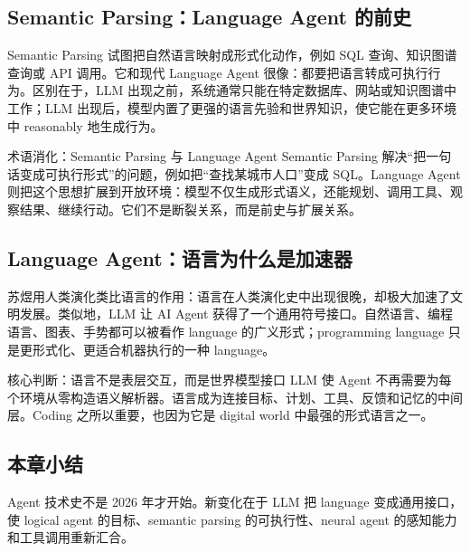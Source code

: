 \subsection{Semantic Parsing：Language Agent 的前史}

Semantic Parsing 试图把自然语言映射成形式化动作，例如 SQL 查询、知识图谱查询或 API 调用。它和现代 Language Agent 很像：都要把语言转成可执行行为。区别在于，LLM 出现之前，系统通常只能在特定数据库、网站或知识图谱中工作；LLM 出现后，模型内置了更强的语言先验和世界知识，使它能在更多环境中 reasonably 地生成行为。

\begin{knowledgebox}{术语消化：Semantic Parsing 与 Language Agent}
Semantic Parsing 解决“把一句话变成可执行形式”的问题，例如把“查找某城市人口”变成 SQL。Language Agent 则把这个思想扩展到开放环境：模型不仅生成形式语义，还能规划、调用工具、观察结果、继续行动。它们不是断裂关系，而是前史与扩展关系。
\end{knowledgebox}

\subsection{Language Agent：语言为什么是加速器}

苏煜用人类演化类比语言的作用：语言在人类演化史中出现很晚，却极大加速了文明发展。类似地，LLM 让 AI Agent 获得了一个通用符号接口。自然语言、编程语言、图表、手势都可以被看作 language 的广义形式；programming language 只是更形式化、更适合机器执行的一种 language。

\begin{importantbox}{核心判断：语言不是表层交互，而是世界模型接口}
LLM 使 Agent 不再需要为每个环境从零构造语义解析器。语言成为连接目标、计划、工具、反馈和记忆的中间层。Coding 之所以重要，也因为它是 digital world 中最强的形式语言之一。
\end{importantbox}

\subsection{本章小结}

Agent 技术史不是 2026 年才开始。新变化在于 LLM 把 language 变成通用接口，使 logical agent 的目标、semantic parsing 的可执行性、neural agent 的感知能力和工具调用重新汇合。

